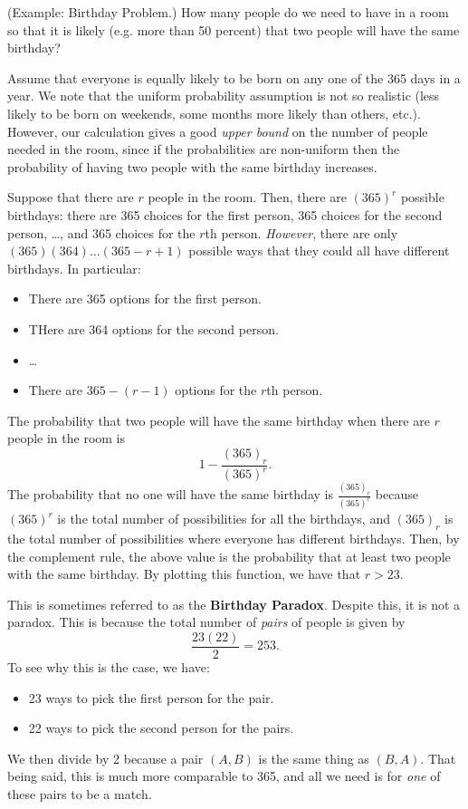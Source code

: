 \documentclass[letterpaper]{article}
\begin{document}
\begin{mdframed}[]
    (Example: Birthday Problem.) How many people do we need to have in a room so that it is likely (e.g. more than 50 percent) that two people will have the same birthday? 

    \bigskip 

    Assume that everyone is equally likely to be born on any one of the 365 days in a year. We note that the uniform probability assumption is not so realistic (less likely to be born on weekends, some months more likely than others, etc.). However, our calculation gives a good \emph{upper bound} on the number of people needed in the room, since if the probabilities are non-uniform then the probability of having two people with the same birthday increases. 

    \bigskip 

    Suppose that there are $r$ people in the room. Then, there are $(365)^r$ possible birthdays: there are 365 choices for the first person, 365 choices for the second person, \dots, and 365 choices for the $r$th person. \emph{However}, there are only $(365)(364) \dots (365 - r + 1)$ possible ways that they could all have different birthdays. In particular: 
    \begin{itemize}
        \item There are 365 options for the first person. 
        \item THere are 364 options for the second person. 
        \item \dots 
        \item There are $365 - (r - 1)$ options for the $r$th person. 
    \end{itemize}
    The probability that two people will have the same birthday when there are $r$ people in the room is 
    \[1 - \frac{(365)_r}{(365)^r}.\]
    The probability that no one will have the same birthday is $\frac{(365)_r}{(365)^r}$ because $(365)^r$ is the total number of possibilities for all the birthdays, and $(365)_r$ is the total number of possibilities where everyone has different birthdays. Then, by the complement rule, the above value is the probability that at least two people with the same birthday. By plotting this function, we have that $r > 23$. 

    \bigskip 

    This is sometimes referred to as the \textbf{Birthday Paradox}. Despite this, it is not a paradox. This is because the total number of \emph{pairs} of people is given by 
    \[\frac{23(22)}{2} = 253.\]
    To see why this is the case, we have: 
    \begin{itemize}
        \item 23 ways to pick the first person for the pair. 
        \item 22 ways to pick the second person for the pairs. 
    \end{itemize}
    We then divide by 2 because a pair $(A, B)$ is the same thing as $(B, A)$. That being said, this is much more comparable to 365, and all we need is for \emph{one} of these pairs to be a match. 
\end{mdframed}
\end{document}
